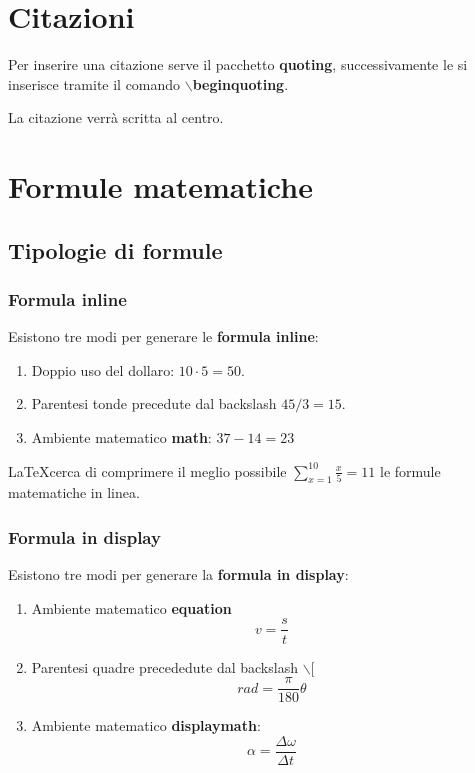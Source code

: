 \documentclass[a4paper, 12pt]{book}
\theoremstyle{plain}
\begin{document}
	\section{Citazioni}
	
	Per inserire una citazione serve il pacchetto \textbf{quoting}, successivamente le si inserisce tramite il comando \textbf{$\backslash$begin{quoting}}.
	
	\begin{quoting}
		La citazione verrà scritta al centro.
	\end{quoting}

	\section{Formule matematiche}
	\subsection{Tipologie di formule}
	\subsubsection{Formula inline}
	Esistono tre modi per generare le \textbf{formula inline}:
	\begin{enumerate}
		\item Doppio uso del dollaro: $10\cdot 5 = 50$.
		\item Parentesi tonde precedute dal backslash \(45 / 3 = 15\).
		\item Ambiente matematico \textbf{math}: \begin{math}
		37 - 14 = 23
		\end{math}
	\end{enumerate}
	\LaTeX cerca di comprimere il meglio possibile $\sum_{x=1}^{10}\frac{x}{5} = 11$ le formule matematiche in linea.
	
	\subsubsection{Formula in display}
	Esistono tre modi per generare la \textbf{formula in display}:
	\begin{enumerate}
		\item Ambiente matematico \textbf{equation}
		\begin{equation}
		v = \frac{s}{t}
		\end{equation}
		\item Parentesi quadre precededute dal backslash $\backslash$[
		\[
		rad = \frac{\pi}{180}\theta
		\]
		\item Ambiente matematico \textbf{displaymath}:
		\begin{displaymath}
		\alpha = \frac{\Delta\omega}{\Delta t}
		\end{displaymath}
	\end{enumerate}
\end{document}
